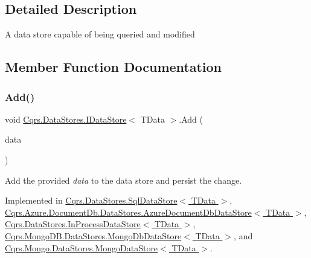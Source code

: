 \subsection{Detailed Description}
A data store capable of being queried and modified 



\subsection{Member Function Documentation}
\mbox{\label{interfaceCqrs_1_1DataStores_1_1IDataStore_a114404daaf37fec9cc5547cd9a17858c}} 
\subsubsection{\texorpdfstring{Add()}{Add()}\hspace{0.1cm}{\footnotesize\ttfamily [1/2]}}
{\footnotesize\ttfamily void \hyperlink{interfaceCqrs_1_1DataStores_1_1IDataStore}{Cqrs.\+Data\+Stores.\+I\+Data\+Store}$<$ T\+Data $>$.Add (\begin{DoxyParamCaption}\item[{T\+Data}]{data }\end{DoxyParamCaption})}



Add the provided {\itshape data}  to the data store and persist the change. 



Implemented in \hyperlink{classCqrs_1_1DataStores_1_1SqlDataStore_abcca53d2e93dbdfb193a9fb0996849c5}{Cqrs.\+Data\+Stores.\+Sql\+Data\+Store$<$ T\+Data $>$}, \hyperlink{classCqrs_1_1Azure_1_1DocumentDb_1_1DataStores_1_1AzureDocumentDbDataStore_ad17e6e846430e617af24be48b77d1528}{Cqrs.\+Azure.\+Document\+Db.\+Data\+Stores.\+Azure\+Document\+Db\+Data\+Store$<$ T\+Data $>$}, \hyperlink{classCqrs_1_1DataStores_1_1InProcessDataStore_ade5c4033c628598665c0cba986a54c15}{Cqrs.\+Data\+Stores.\+In\+Process\+Data\+Store$<$ T\+Data $>$}, \hyperlink{classCqrs_1_1MongoDB_1_1DataStores_1_1MongoDbDataStore_affcb1268469b99963501dd8c58e4a480}{Cqrs.\+Mongo\+D\+B.\+Data\+Stores.\+Mongo\+Db\+Data\+Store$<$ T\+Data $>$}, and \hyperlink{classCqrs_1_1Mongo_1_1DataStores_1_1MongoDataStore_a27bcfb40fe8203e09d320b2aa19fff3a}{Cqrs.\+Mongo.\+Data\+Stores.\+Mongo\+Data\+Store$<$ T\+Data $>$}.

